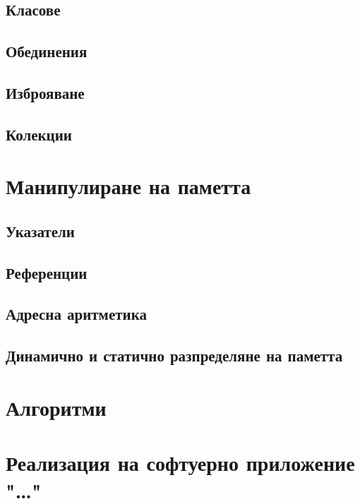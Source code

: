 \documentclass[oneside]{book}
\begin{document}
\section{Класове}
\section{Обединения}
\section{Изброяване}
\section{Колекции}

\chapter{Манипулиране на паметта}
\section{Указатели}
\section{Референции}
\section{Адресна аритметика}
\section{Динамично и статично разпределяне на паметта}

\chapter{Алгоритми}

\chapter*{Реализация на софтуерно приложение "\dots"}
\end{document}
